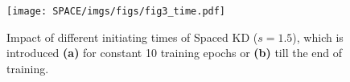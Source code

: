 \begin{figure}[htbp!]
    \centering
    \texttt{[image: SPACE/imgs/figs/fig3\_time.pdf]}
    \caption{Impact of different initiating times of Spaced KD ($s=1.5$), which is introduced \textbf{(a)} for constant 10 training epochs or \textbf{(b)} till the end of training. %
    }
    \label{fig:time}
\end{figure}


